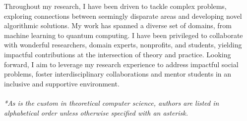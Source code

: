 \documentclass[11pt]{article}
\begin{document}

Throughout my research, I have been driven to tackle complex problems, exploring connections between seemingly disparate areas and developing novel algorithmic solutions.
My work has spanned a diverse set of domains, from machine learning to quantum computing.
I have been privileged to collaborate with wonderful researchers, domain experts, nonprofits, and students, yielding impactful contributions at the intersection of theory and practice.
Looking forward, I aim to leverage my research experience to address impactful social problems, foster interdisciplinary collaborations and mentor students in an inclusive and supportive environment.

\paragraph{}


	
\textit{*As is the custom in theoretical computer science, authors are listed in alphabetical order unless otherwise specified with an asterisk.}
\end{document}
